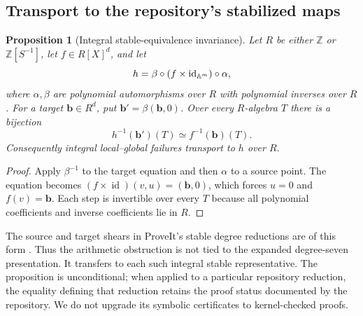 \documentclass[11pt]{article}
\numberwithin{equation}{section}
\theoremstyle{plain}
\newtheorem{proposition}[proposition]{Proposition}
\theoremstyle{plain}
\theoremstyle{plain}
\theoremstyle{definition}
\theoremstyle{definition}
\theoremstyle{definition}
\theoremstyle{remark}
\newcommand{\Z}{\mathbb Z}\newcommand{\Q}{\mathbb Q}
\newcommand{\target}{\boldsymbol b}
\begin{document}
\subsection{Transport to the repository's stabilized maps}
\begin{proposition}[Integral stable-equivalence invariance]\label{alg:prop:stable}
Let $R$ be either $\Z$ or $\Z[S^{-1}]$, let $f\in R[X]^d$, and let
\[
 h=\beta\circ(f\times\operatorname{id}_{\mathbb A^m})\circ\alpha,
\]
where $\alpha,\beta$ are polynomial automorphisms over $R$ with polynomial
inverses over $R$. For a target $\target\in R^d$, put
$\target'=\beta(\target,0)$. Over every $R$-algebra $T$ there is a
bijection
\[
 h^{-1}(\target')(T)\simeq f^{-1}(\target)(T).
\]
Consequently integral local--global failures transport to $h$ over $R$.
\end{proposition}
\begin{proof}
Apply $\beta^{-1}$ to the target equation and then $\alpha$ to a source
point. The equation becomes
$(f\times\operatorname{id})(v,u)=(\target,0)$, which forces $u=0$ and
$f(v)=\target$. Each step is invertible over every $T$ because all
polynomial coefficients and inverse coefficients lie in $R$.
\end{proof}
The source and target shears in ProveIt's stable degree reductions are
of this form \cite{proveitresearch}. Thus the arithmetic obstruction is
not tied to the expanded degree-seven presentation. It transfers to each
such integral stable representative. The proposition is unconditional;
when applied to a particular repository reduction, the equality defining
that reduction retains the proof status documented by the repository.
We do not upgrade its symbolic certificates to kernel-checked proofs.
\end{document}
